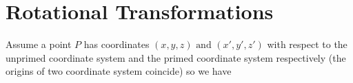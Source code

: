 \documentclass[a4paper,12pt]{report}
\begin{document}
  

































\chapter{Rotational Transformations}

Assume a point \(P\) has coordinates \((x, y, z) \text{ and }  (x', y', z')\) with respect to the unprimed coordinate system and the primed coordinate system respectively (the origins of two coordinate system coincide) so we have
\end{document}
